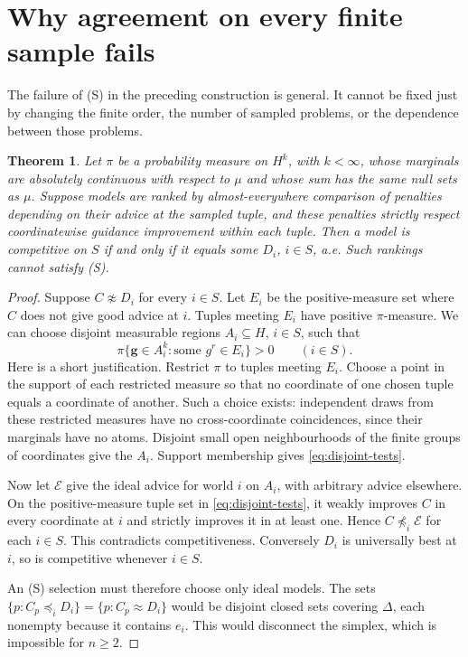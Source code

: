 \documentclass[11pt]{article}
\newtheorem{theorem}{Theorem}
\theoremstyle{remark}\newtheorem{remark}[theorem]{Remark}
\newcommand{\Escr}{\mathcal E}
\begin{document}
\section{Why agreement on every finite sample fails}

The failure of (S) in the preceding construction is general. It cannot be
fixed just by changing the finite order, the number of sampled problems,
or the dependence between those problems.

\begin{theorem}\label{thm:finite-sample}
Let $\pi$ be a probability measure on $H^k$, with $k<\infty$, whose
marginals are absolutely continuous with respect to $\mu$ and whose sum
has the same null sets as $\mu$.
Suppose models are ranked by almost-everywhere comparison of penalties
depending on their advice at the sampled tuple, and these penalties strictly
respect coordinatewise guidance improvement within each tuple.
Then a model is competitive on $S$ if and only if it equals some $D_i$,
$i\in S$, a.e. Such rankings cannot satisfy (S).
\end{theorem}
\begin{proof}
Suppose $C\not\approx D_i$ for every $i\in S$. Let $E_i$ be the
positive-measure set where $C$ does not give good advice at $i$.
Tuples meeting $E_i$ have positive $\pi$-measure.
We can choose disjoint measurable regions $A_i\subseteq H$, $i\in S$,
such that
\begin{equation}
 \pi\{\boldsymbol g\in A_i^k:
       \text{some }g^r\in E_i\}>0\qquad(i\in S).
 \label{eq:disjoint-tests}
\end{equation}
Here is a short justification. Restrict $\pi$ to tuples meeting $E_i$.
Choose a point in the support of each restricted measure so that no
coordinate of one chosen tuple equals a coordinate of another.
Such a choice exists: independent draws from these restricted measures
have no cross-coordinate coincidences, since their marginals have no atoms.
Disjoint small open neighbourhoods of the finite groups of coordinates give
the $A_i$. Support membership gives \eqref{eq:disjoint-tests}.

Now let $\Escr$ give the ideal advice for world $i$ on $A_i$, with arbitrary
advice elsewhere. On the positive-measure tuple set in
\eqref{eq:disjoint-tests}, it weakly improves $C$ in every coordinate at $i$
and strictly improves it in at least one. Hence $C\not\preceq_i\Escr$ for
each $i\in S$. This contradicts competitiveness. Conversely $D_i$ is
universally best at $i$, so is competitive whenever $i\in S$.

An (S) selection must therefore choose only ideal models. The sets
$\{p:C_p\preceq_i D_i\}=\{p:C_p\approx D_i\}$ would be disjoint closed
sets covering $\Delta$, each nonempty because it contains $e_i$.
This would disconnect the simplex, which is impossible for $n\ge2$.
\end{proof}
\end{document}
